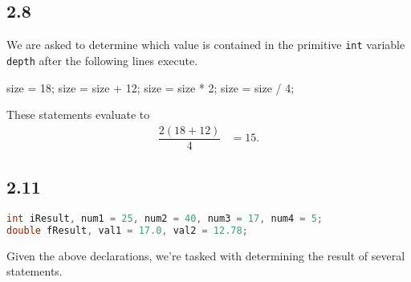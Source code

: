 \documentclass[leqno, 11pt]{article}
\begin{document}
\subsection*{2.8}
We are asked to determine which value is contained in the primitive \texttt{int} variable \texttt{depth} after the following lines execute.
\begin{verbbox}
size = 18;
size = size + 12;
size = size * 2;
size = size / 4;
\end{verbbox}
\begin{center}
\theverbbox
\end{center}
These statements evaluate to
\begin{align*}
\dfrac{2\left(18 + 12\right)}{4}&=\boxed{15.}
\end{align*}
\subsection*{2.11}
\begin{lstlisting}[language=java, xleftmargin=0.25\textwidth]
int iResult, num1 = 25, num2 = 40, num3 = 17, num4 = 5;
double fResult, val1 = 17.0, val2 = 12.78;
\end{lstlisting}
Given the above declarations, we're tasked with determining the result of several statements.
\end{document}

